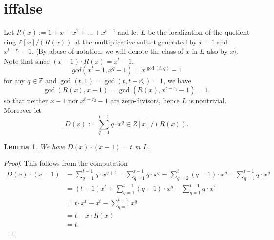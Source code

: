 \documentclass[12pt,a4paper]{article}
\newtheorem{lemma}[theorem]{Lemma}
\theoremstyle{definition}
\newcommand{\Z}{\mathbb{Z}}
\newcommand{\uo}{\overline{r_2}}
\begin{document}
\iffalse
\section{iffalse}
\paragraph*{}
Let  $R(x):=1+x+x^2+\dots+x^{t-1}$ and let $L$ be the localization of the quotient ring $\Z[x]/(R(x))$ at the multiplicative subset generated by $x-1$ and $x^{t-\uo}-1$. (By abuse of notation, we will denote the class of $x$ in $L$ also by $x$). Note that since $(x-1)\cdot R(x)=x^t-1$, $$gcd(x^t-1,x^q-1)=x^{\gcd(t,q)}-1$$ for any $q\in\Z$ and $\gcd(t,1)=\gcd(t,t-\uo)=1$, we have $$\gcd(R(x),x-1)=\gcd(R(x),x^{t-\uo}-1)=1,$$ so that neither $x-1$ nor $x^{t-\uo}-1$ are zero-divisors, hence $L$ is nontrivial. Moreover let $$D(x):=\sum_{q=1}^{t-1}q\cdot x^q\in Z[x]/(R(x)).$$

\begin{lemma}
We have $D(x)\cdot(x-1)=t$ in $L$.
\end{lemma}
\begin{proof}
This follows from the computation
\begin{equation*}
\begin{split}
D(x)\cdot(x-1)&=\sum_{q=1}^{t-1} q\cdot x^{q+1}-\sum_{q=1}^{t-1} q\cdot x^q=\sum_{q=2}^{t} (q-1)\cdot x^{q}-\sum_{q=1}^{t-1} q\cdot x^q\\
&=(t-1)x^t+\sum_{q=1}^{t-1} (q-1)\cdot x^{q}-\sum_{q=1}^{t-1} q\cdot x^q\\
&=t\cdot x^t-x^t-\sum_{q=1}^{t-1} x^{q}\\
&=t-x\cdot R(x)\\
&=t.
\end{split}
\end{equation*}
\end{proof}
\end{document}
